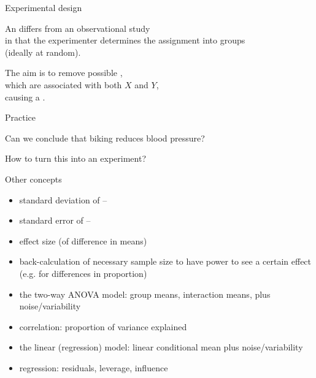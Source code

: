 \begin{frame}{Experimental design}

    An  differs from an \alert{observational study} \\
    in that the experimenter determines the assignment into groups\\
    (ideally at random).

    \vspace{2em}

    The aim is to remove possible ,\\
    which are associated with both $X$ and $Y$, \\
    causing a .

    \vspace{2em}

\end{frame}

\begin{frame}{Practice}

    \vfill

    Can we conclude that biking reduces blood pressure?
    \vfill

    How to turn this into an experiment?
    \vfill

\end{frame}

\begin{frame}{Other concepts}
  
  \begin{itemize}
    \item standard deviation of --
    \item standard error of --
    \item effect size (of difference in means)
    \item back-calculation of necessary sample size to have power to see a certain effect (e.g. for differences in proportion)
    \item the two-way ANOVA model: group means, interaction means, plus noise/variability
    \item correlation: proportion of variance explained
    \item the linear (regression) model: linear conditional mean plus noise/variability
    \item regression: residuals, leverage, influence
  \end{itemize}


\end{frame}

